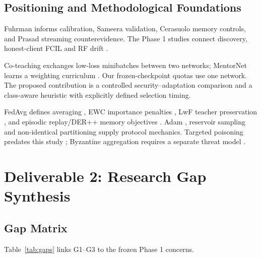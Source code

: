 \documentclass[10pt,a4paper]{article}
\begin{document}
\subsection{Positioning and Methodological Foundations}
Fuhrman informs calibration, Sameera validation, Cerasuolo memory controls, and Prasad streaming counterevidence. The Phase 1 studies connect discovery, honest-client FCIL and RF drift \cite{ge,wu,luo}.

Co-teaching exchanges low-loss minibatches between two networks; MentorNet learns a weighting curriculum \cite{coteach,mentornet}. Our frozen-checkpoint quotas use one network. The proposed contribution is a controlled security--adaptation comparison and a class-aware heuristic with explicitly defined selection timing.

FedAvg defines averaging \cite{fedavg}, EWC importance penalties \cite{ewc}, LwF teacher preservation \cite{lwf}, and episodic replay/DER++ memory objectives \cite{tiny,der}. Adam \cite{adam}, reservoir sampling \cite{vitter} and non-identical partitioning \cite{hsu} supply protocol mechanics. Targeted poisoning predates this study \cite{tolpegin}; Byzantine aggregation requires a separate threat model \cite{krum,yin}.

\section{Deliverable 2: Research Gap Synthesis}
\subsection{Gap Matrix}
Table~\ref{tab:gaps} links G1--G3 to the frozen Phase 1 concerns.
\end{document}
